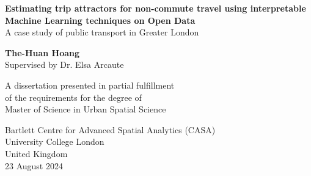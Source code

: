 \begin{titlepage}
    \begin{center}
        \vspace*{5cm}
 
        \textbf{\LARGE{Estimating trip attractors for non-commute travel using interpretable Machine Learning techniques on Open Data}}\\
        \vspace{1cm}
        A case study of public transport in Greater London\\

        \vspace{3cm}
 
        \textbf{The-Huan Hoang}\\
        Supervised by Dr. Elsa Arcaute
 
        \vfill
             
        A dissertation presented in partial fulfillment \\
        of the requirements for the degree of\\
        Master of Science in Urban Spatial Science
             
        \vspace{1cm}
                 
        Bartlett Centre for Advanced Spatial Analytics (CASA) \\
        University College London\\
        United Kingdom\\
        23 August 2024
             
    \end{center}
 \end{titlepage}